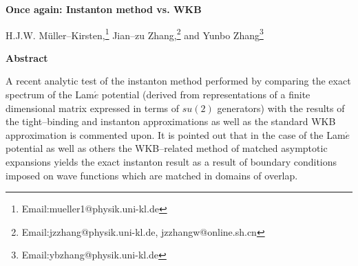 \documentclass[a4paper,12pt,a4]{article}
\begin{document}
\setlength{\textheight}{7.4in}
\setlength{\topmargin}{-0.6in}
\setlength{\oddsidemargin}{0.2in}
\setlength{\evensidemargin}{0.5in}
\renewcommand{\thefootnote}{\fnsymbol{footnote}}

\begin{center}
{\Large {\bf Once again: Instanton method vs. WKB}}

\vspace{0.8cm}

{H.J.W. M\"uller--Kirsten,\raisebox{0.8ex}{\small a}\footnote[1]
{ Email:mueller1@physik.uni-kl.de}
Jian--zu Zhang,\raisebox{0.8ex}{\small a,b}\footnote[2]
{Email:jzzhang@physik.uni-kl.de, jzzhangw@online.sh.cn}
and Yunbo Zhang\raisebox{0.8 ex}{\small a,c}\footnote[3]
{Email:ybzhang@physik.uni-kl.de}}




\end{center}

\vspace{0.3cm}

{\centerline{\bf Abstract}}
\noindent
A recent analytic test of the instanton method
performed by comparing the exact spectrum of the
Lam${\acute e}$ potential (derived from representations of a
finite dimensional matrix expressed in terms of $su(2)$
generators) with the results of the tight--binding and  instanton
approximations as well as the standard WKB approximation
is commented upon. It is pointed out  that in the case
of the Lam${\acute e}$ potential as well as
others the WKB--related method of matched
asymptotic expansions yields the exact instanton
result as a result of boundary
conditions imposed on wave functions which are matched in 
domains of overlap.

\vspace{2cm}
\end{document}
